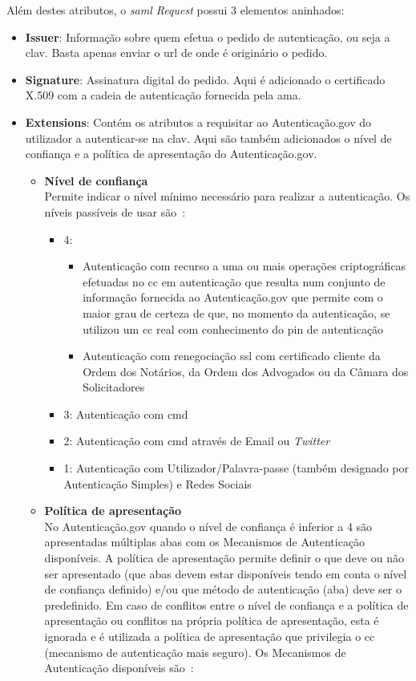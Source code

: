 Além destes atributos, o \textit{\acrshort{saml} Request} possui 3 elementos aninhados:
\begin{itemize}
    \item \textbf{Issuer}: Informação sobre quem efetua o pedido de autenticação, ou seja a \acrshort{clav}. Basta apenas enviar o \acrshort{url} de onde é originário o pedido.
    \item \textbf{Signature}: Assinatura digital do pedido. Aqui é adicionado o certificado X.509 com a cadeia de autenticação fornecida pela \acrshort{ama}.
    \item \textbf{Extensions}: Contém os atributos a requisitar ao Autenticação.gov do utilizador a autenticar-se na \acrshort{clav}. Aqui são também adicionados o nível de confiança e a política de apresentação do Autenticação.gov.
    \begin{itemize}
        \item \textbf{Nível de confiança} \\
        Permite indicar o nível mínimo necessário para realizar a autenticação. Os níveis passíveis de usar são~\cite{agov2}:
        \begin{itemize}
            \item 4:
            \begin{itemize}
                \item Autenticação com recurso a uma ou mais operações criptográficas efetuadas no \acrlong{cc} em autenticação que resulta num conjunto de informação fornecida ao Autenticação.gov que permite com o maior grau de certeza de que, no momento da autenticação, se utilizou um \acrlong{cc} real com conhecimento do \acrshort{pin} de autenticação
                \item Autenticação com renegociação \acrshort{ssl} com certificado cliente da Ordem dos Notários, da Ordem dos Advogados ou da Câmara dos Solicitadores
            \end{itemize}
            \item 3: Autenticação com \acrlong{cmd}
            \item 2: Autenticação com \acrlong{cmd} através de Email ou \textit{Twitter}
            \item 1: Autenticação com Utilizador/Palavra-passe (também designado por Autenticação Simples) e Redes Sociais
        \end{itemize}
        \item \textbf{Política de apresentação} \\
        No Autenticação.gov quando o nível de confiança é inferior a 4 são apresentadas múltiplas abas com os Mecanismos de Autenticação disponíveis. A política de apresentação permite definir o que deve ou não ser apresentado (que abas devem estar disponíveis tendo em conta o nível de confiança definido) e/ou que método de autenticação (aba) deve ser o predefinido. Em caso de conflitos entre o nível de confiança e a política de apresentação ou conflitos na própria política de apresentação, esta é ignorada e é utilizada a política de apresentação que privilegia o \acrshort{cc} (mecanismo de autenticação mais seguro). Os Mecanismos de Autenticação disponíveis são~\cite{agov2}:

\end{itemize}
\end{itemize}
